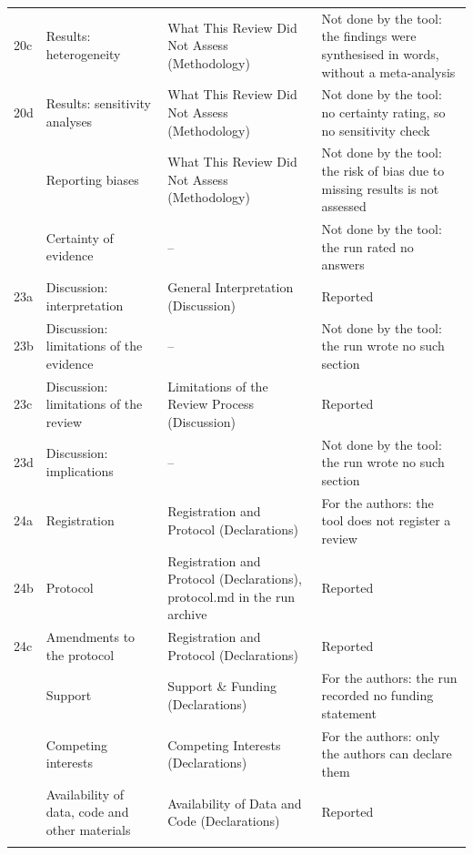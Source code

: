 \documentclass[10pt,a4paper]{article}
\begin{document}
\begin{tabularx}{\textwidth}{l >{\hsize}Y >{\hsize}Y >{\hsize}Y}
20c & Results: heterogeneity & What This Review Did Not Assess (Methodology) & Not done by the tool: the findings were synthesised in words, without a meta-analysis\\ \addlinespace
20d & Results: sensitivity analyses & What This Review Did Not Assess (Methodology) & Not done by the tool: no certainty rating, so no sensitivity check\\  & Reporting biases & What This Review Did Not Assess (Methodology) & Not done by the tool: the risk of bias due to missing results is not assessed\\  & Certainty of evidence & -- & Not done by the tool: the run rated no answers\\ \addlinespace
23a & Discussion: interpretation & General Interpretation (Discussion) & Reported\\ \addlinespace
23b & Discussion: limitations of the evidence & -- & Not done by the tool: the run wrote no such section\\ \addlinespace
23c & Discussion: limitations of the review & Limitations of the Review Process (Discussion) & Reported\\ \addlinespace
23d & Discussion: implications & -- & Not done by the tool: the run wrote no such section\\ \addlinespace
24a & Registration & Registration and Protocol (Declarations) & For the authors: the tool does not register a review\\ \addlinespace
24b & Protocol & Registration and Protocol (Declarations), protocol.md in the run archive & Reported\\ \addlinespace
24c & Amendments to the protocol & Registration and Protocol (Declarations) & Reported\\  & Support & Support \& Funding (Declarations) & For the authors: the run recorded no funding statement\\  & Competing interests & Competing Interests (Declarations) & For the authors: only the authors can declare them\\  & Availability of data, code and other materials & Availability of Data and Code (Declarations) & Reported\\ \addlinespace
\bottomrule
\end{tabularx}
\vspace{2pt}
\end{document}
